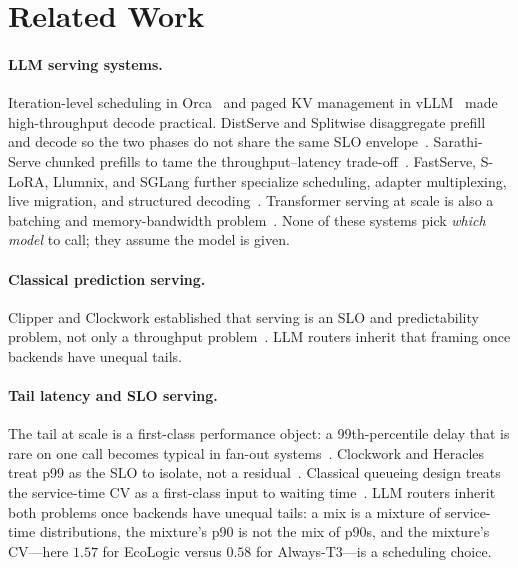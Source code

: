 \documentclass[10pt,conference]{IEEEtran}
\begin{document}
\section{Related Work}

\paragraph{LLM serving systems.}
Iteration-level scheduling in Orca~\cite{yu2022orca} and paged KV management in vLLM~\cite{kwon2023vllm} made high-throughput decode practical. DistServe and Splitwise disaggregate prefill and decode so the two phases do not share the same SLO envelope~\cite{zhong2024distserve,patel2024splitwise}. Sarathi-Serve chunked prefills to tame the throughput--latency trade-off~\cite{agrawal2023sarathichunk,agrawal2024sarathi}. FastServe, S-LoRA, Llumnix, and SGLang further specialize scheduling, adapter multiplexing, live migration, and structured decoding~\cite{wu2023fastserve,sheng2024slora,sun2024llumnix,zheng2024sglang}. Transformer serving at scale is also a batching and memory-bandwidth problem~\cite{pope2023efficiently}. None of these systems pick \emph{which model} to call; they assume the model is given.

\paragraph{Classical prediction serving.}
Clipper and Clockwork established that serving is an SLO and predictability problem, not only a throughput problem~\cite{crankshaw2017clipper,gujarati2020clockwork}. LLM routers inherit that framing once backends have unequal tails.

\paragraph{Tail latency and SLO serving.}
The tail at scale is a first-class performance object: a 99th-percentile delay that is rare on one call becomes typical in fan-out systems~\cite{dean2013tail}. Clockwork and Heracles treat p99 as the SLO to isolate, not a residual~\cite{gujarati2020clockwork,lo2015heracles}. Classical queueing design treats the service-time CV as a first-class input to waiting time~\cite{kleinrock1975queueing,harchol2013performance}. LLM routers inherit both problems once backends have unequal tails: a mix is a mixture of service-time distributions, the mixture's p90 is not the mix of p90s, and the mixture's CV---here $1.57$ for EcoLogic versus $0.58$ for Always-T3---is a scheduling choice.
\end{document}
